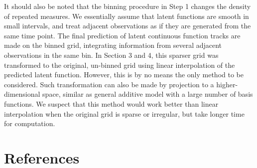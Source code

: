 \documentclass[
  11pt,
]{article}
\begin{document}
It should also be noted that the binning procedure in Step 1 changes the
density of repeated measures. We essentially assume that latent
functions are smooth in small intervals, and treat adjacent observations
as if they are generated from the same time point. The final prediction
of latent continuous function tracks are made on the binned grid,
integrating information from several adjacent observations in the same
bin. In Section 3 and 4, this sparser grid was transformed to the
original, un-binned grid using linear interpolation of the predicted
latent function. However, this is by no means the only method to be
considered. Such transformation can also be made by projection to a
higher-dimensional space, similar as general additive model with a large
number of basis functions. We suspect that this method would work better
than linear interpolation when the original grid is sparse or irregular,
but take longer time for computation.

\hypertarget{references}{%
\section{References}\label{references}}
\end{document}
